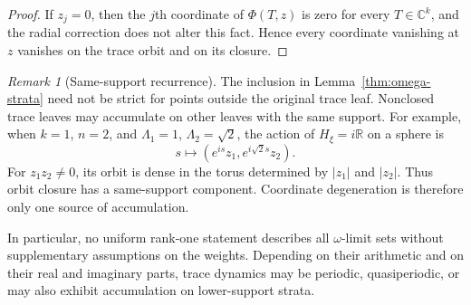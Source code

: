 \documentclass[11pt]{amsart}
\theoremstyle{definition}
\theoremstyle{remark}
\newtheorem{remark}[theorem]{Remark}
\newcommand{\C}{\mathbb{C}}
\newcommand{\R}{\mathbb{R}}
\begin{document}
\begin{proof}
	If $z_j=0$, then the $j$th coordinate of $\Phi(T,z)$ is zero for every $T\in\C^k$, and the radial correction does not alter this fact.
	Hence every coordinate vanishing at $z$ vanishes on the trace orbit and on its closure.
\end{proof}

\begin{remark}[Same-support recurrence]
	\label{rem:same-support}
	The inclusion in Lemma~\ref{thm:omega-strata} need not be strict for points outside the original trace leaf.
	Nonclosed trace leaves may accumulate on other leaves with the same support.
	For example, when $k=1$, $n=2$, and $\Lambda_1=1$, $\Lambda_2=\sqrt2$, the action of $H_\xi=i\R$ on a sphere is
	\[
		s\longmapsto(e^{is}z_1,e^{i\sqrt2s}z_2).
	\]
	For $z_1z_2\ne0$, its orbit is dense in the torus determined by $|z_1|$ and $|z_2|$.
	Thus orbit closure has a same-support component.
	Coordinate degeneration is therefore only one source of accumulation.
\end{remark}

In particular, no uniform rank-one statement describes all $\omega$-limit sets without supplementary assumptions on the weights.
Depending on their arithmetic and on their real and imaginary parts, trace dynamics may be periodic, quasiperiodic, or may also exhibit accumulation on lower-support strata.

\medskip
\end{document}
